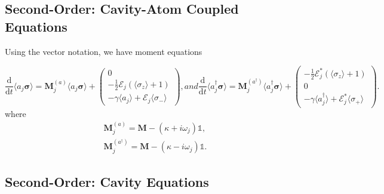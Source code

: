 \documentclass{article}
\newcommand{\ddt}[1][]{\frac{\mathrm{d} #1}{\mathrm{d}t}}
\begin{document}
\subsection{Second-Order: Cavity-Atom Coupled Equations}

Using the vector notation, we have moment equations

\begin{subequations}
	\begin{equation}
		\ddt \langle a_{j} \bm{\sigma} \rangle = \bm{M}_{j}^{(a)} \langle a_{j} \bm{\sigma} \rangle +
		\begin{pmatrix}
			0 \\
			-\frac{1}{2} \mathcal{E}_{j} \left( \langle \sigma_{z} \rangle + 1 \right) \\
			-\gamma \langle a_{j} \rangle + \mathcal{E}_{j} \langle \sigma_{-} \rangle
		\end{pmatrix},
	\end{equation}
	and
	\begin{equation}
		\ddt \langle a^{\dagger}_{j} \bm{\sigma} \rangle = \bm{M}_{j}^{(a^{\dagger})} \langle a^{\dagger}_{j} \bm{\sigma} \rangle +
		\begin{pmatrix}
			-\frac{1}{2} \mathcal{E}_{j}^{*} \left( \langle \sigma_{z} \rangle + 1 \right) \\
			0 \\
			-\gamma \langle a^{\dagger}_{j} \rangle + \mathcal{E}_{j}^{*} \langle \sigma_{+} \rangle
		\end{pmatrix}.
	\end{equation}
\end{subequations}
where
\begin{subequations}
	\begin{gather}
		\bm{M}_{j}^{(a)} = \bm{M} - \left( \kappa + i \omega_{j} \right) \mathbb{1}, \\
		 \bm{M}_{j}^{(a^{\dagger})} = \bm{M} - \left( \kappa - i \omega_{j} \right) \mathbb{1}.
	\end{gather}
\end{subequations}

\subsection{Second-Order: Cavity Equations}
\end{document}
